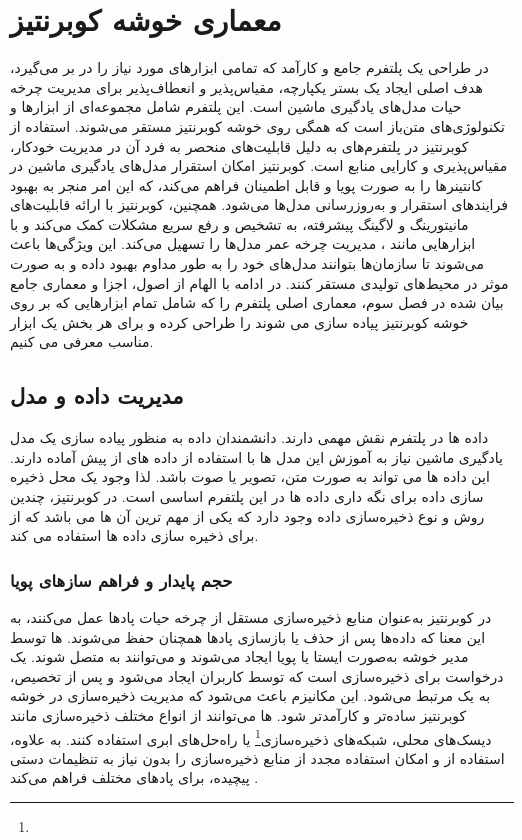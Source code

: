 \section{معماری خوشه کوبرنتیز}
در طراحی یک پلتفرم  جامع و کارآمد که تمامی ابزارهای مورد نیاز را در بر می‌گیرد، هدف اصلی ایجاد یک بستر یکپارچه، مقیاس‌پذیر و انعطاف‌پذیر برای مدیریت چرخه حیات مدل‌های یادگیری ماشین است. این پلتفرم شامل مجموعه‌ای از ابزارها و تکنولوژی‌های متن‌باز است که همگی روی خوشه کوبرنتیز مستقر می‌شوند. استفاده از کوبرنتیز در پلتفرم‌های  به دلیل قابلیت‌های منحصر به فرد آن در مدیریت خودکار، مقیاس‌پذیری و کارایی منابع است. کوبرنتیز امکان استقرار مدل‌های یادگیری ماشین در کانتینرها را به صورت پویا و قابل اطمینان فراهم می‌کند، که این امر منجر به بهبود فرایندهای استقرار و به‌روزرسانی مدل‌ها می‌شود. همچنین، کوبرنتیز با ارائه قابلیت‌های مانیتورینگ و لاگینگ پیشرفته، به تشخیص و رفع سریع مشکلات کمک می‌کند و با ابزارهایی مانند ، مدیریت چرخه عمر مدل‌ها را تسهیل می‌کند. این ویژگی‌ها باعث می‌شوند تا سازمان‌ها بتوانند مدل‌های خود را به طور مداوم بهبود داده و به صورت موثر در محیط‌های تولیدی مستقر کنند. در ادامه با الهام از اصول، اجزا و معماری جامع بیان شده در فصل سوم، معماری اصلی پلتفرم  را که شامل تمام ابزارهایی که بر روی خوشه کوبرنتیز پیاده سازی می شوند را طراحی کرده و برای هر بخش یک ابزار مناسب معرفی می کنیم.

\subsection{مدیریت داده و مدل}
داده ها در پلتفرم  نقش مهمی دارند. دانشمندان داده به منظور پیاده سازی یک مدل یادگیری ماشین نیاز به آموزش این مدل ها با استفاده از داده های از پیش آماده دارند. این داده ها می تواند به صورت متن، تصویر یا صوت باشد. لذا وجود یک محل ذخیره سازی داده برای نگه داری داده ها در این پلتفرم اساسی است. در کوبرنتیز، چندین روش و نوع ذخیره‌سازی داده وجود دارد که یکی از مهم ترین آن ها  می باشد که از  برای ذخیره سازی داده ها استفاده می کند.
 
\subsubsection{حجم پایدار و فراهم سازهای پویا}
در کوبرنتیز  به‌عنوان منابع ذخیره‌سازی مستقل از چرخه حیات پادها عمل می‌کنند، به این معنا که داده‌ها پس از حذف یا بازسازی پادها همچنان حفظ می‌شوند. ها توسط مدیر خوشه به‌صورت ایستا یا پویا ایجاد می‌شوند و می‌توانند به  متصل شوند.  یک درخواست برای ذخیره‌سازی است که توسط کاربران ایجاد می‌شود و پس از تخصیص، به یک  مرتبط می‌شود. این مکانیزم باعث می‌شود که مدیریت ذخیره‌سازی در خوشه کوبرنتیز ساده‌تر و کارآمدتر شود. ها می‌توانند از انواع مختلف ذخیره‌سازی مانند دیسک‌های محلی، شبکه‌های ذخیره‌سازی\footnote{} یا راه‌حل‌های ابری استفاده کنند. به علاوه، استفاده از  و  امکان استفاده مجدد از منابع ذخیره‌سازی را بدون نیاز به تنظیمات دستی پیچیده، برای پادهای مختلف فراهم می‌کند \cite{Kubernetes1, Kubernetes2}.

